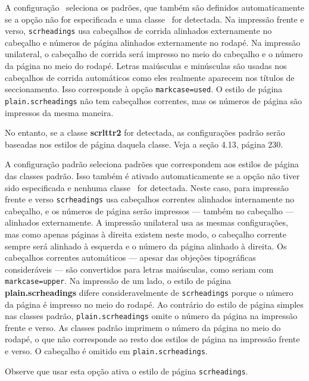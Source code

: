A configuração \KOMAScript\ seleciona os padrões, que também são definidos automaticamente se a opção não for especificada e uma classe \KOMAScript\ for detectada. Na impressão frente e verso, \texttt{scrheadings} usa cabeçalhos de corrida alinhados externamente no cabeçalho e números de página alinhados externamente no rodapé. Na impressão unilateral, o cabeçalho de corrida será impresso no meio do cabeçalho e o número da página no meio do rodapé. Letras maiúsculas e minúsculas são usadas nos cabeçalhos de corrida automáticos como eles realmente aparecem nos títulos de seccionamento. Isso corresponde à opção \texttt{markcase=used}. O estilo de página \texttt{plain.scrheadings} não tem cabeçalhos correntes, mas os números de página são impressos da mesma maneira.

No entanto, se a classe \textbf{scrlttr2} for detectada, as configurações padrão serão baseadas nos estilos de página daquela classe. Veja a seção 4.13, página 230.

A configuração padrão seleciona padrões que correspondem aos estilos de página das classes padrão. Isso também é ativado automaticamente se a opção não tiver sido especificada e nenhuma classe \KOMAScript\ for detectada. Neste caso, para impressão frente e verso \texttt{scrheadings} usa cabeçalhos correntes alinhados internamente no cabeçalho, e os números de página serão impressos --- também no cabeçalho --- alinhados externamente. A impressão unilateral usa as mesmas configurações, mas como apenas páginas à direita existem neste modo, o cabeçalho corrente sempre será alinhado à esquerda e o número da página alinhado à direita. Os cabeçalhos correntes automáticos --- apesar das objeções tipográficas consideráveis --- são convertidos para letras maiúsculas, como seriam com \texttt{markcase=upper}. Na impressão de um lado, o estilo de página \textbf{plain.scrheadings} difere consideravelmente de \texttt{scrheadings} porque o número da página é impresso no meio do rodapé. Ao contrário do estilo de página simples nas classes padrão, \texttt{plain.scrheadings} omite o número da página na impressão frente e verso. As classes padrão imprimem o número da página no meio do rodapé, o que não corresponde ao resto dos estilos de página na impressão frente e verso. O cabeçalho é omitido em \texttt{plain.scrheadings}.

Observe que usar esta opção ativa o estilo de página \texttt{scrheadings}.



